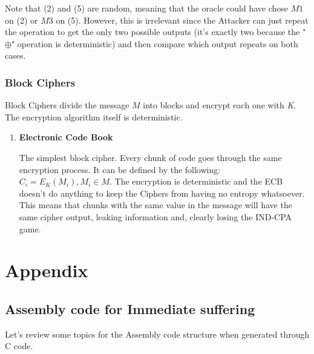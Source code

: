 \documentclass[11pt]{article}
\begin{document}
Note that (2) and (5) are random, meaning that the oracle could have chose \(M1\) on (2) or \(M3\) on (5). However, this is irrelevant since the Attacker can just repeat the operation to get the only two possible outputs (it's exactly two because the "\(\oplus\)" operation is deterministic) and then compare which output repeats on both cases.
\subsubsection{Block Ciphers}
\label{sec:org837de5e}
Block Ciphers divide the message \(M\) into blocks and encrypt each one with \emph{K}. The encryption algorithm itself is deterministic.
\begin{enumerate}
\item \textbf{Electronic Code Book}
\label{sec:org5a85aef}

The simplest block cipher. Every chunk of code goes through the same encryption process. It can be defined by the following: \(C_i = E_K(M_i), M_i \in M\). The encryption is deterministic and the ECB doesn't do anything to keep the Ciphers from having no entropy whatsoever. This means that chunks with the same value in the message will have the same cipher output, leaking information and, clearly losing the IND-CPA game.
\end{enumerate}

\section{Appendix}
\label{sec:org54c189d}
\subsection{Assembly code for Immediate suffering}
\label{sec:org9ef3703}
\label{sec:Assemble}
Let's review some topics for the Assembly code structure when generated through C code.
\end{document}
